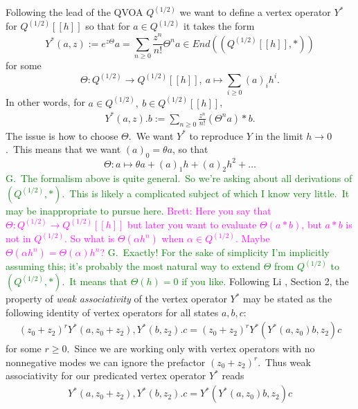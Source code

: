 \documentclass[12pt]{amsart}
\theoremstyle{plain}
\theoremstyle{definition}
\theoremstyle{remark}
\begin{document}
 Following the lead of the QVOA $Q^{(1/2)}$ we want to define a vertex operator $Y^*$ for $Q^{(1/2)}[[h]]$ so that for $a\in Q^{(1/2)}$ it takes the form
 $$Y^*(a, z) := e^{z\Theta}a = \sum_{n\geq0} \frac{z^n}{n!} \Theta^na\in End((Q^{(1/2)}[[h]], *))$$
 for some 
 $$\Theta: Q^{(1/2)}\longrightarrow Q^{(1/2)}[[h]],\ a\mapsto \sum_{i\geq0} (a)_ih^i.$$
In other words, 
for $a\in Q^{(1/2)},\ b\in Q^{(1/2)}[[h]]$, 
\begin{eqnarray}\label{deformedY}
Y^*(a, z).b := \sum_{n\geq0} \frac{z^n}{n!}(\Theta^na)*b.
\end{eqnarray}
The issue is how to choose $\Theta$.\ We want $Y^*$ to reproduce $Y$ in the limit $h\rightarrow 0$.\ 
This means that we want $(a)_0=\theta a$, so that
$$\Theta:a \mapsto \theta a+ (a)_1h+(a)_2h^2+\hdots$$
\textcolor{green}{G.\ The formalism above is quite general.\ So we're asking about all derivations of $(Q^{(1/2)}, *)$.\ This is likely a complicated subject of which I know very little.\ It may be inappropriate to pursue here. }\textcolor{magenta}{Brett: Here you say that $\Theta\colon Q^{(1/2)}\rightarrow Q^{(1/2)}[[h]]$ but later you want to evaluate $\Theta(a*b)$, but $a*b$ is not in $Q^{(1/2)}$. So what is $\Theta(\alpha h^n)$ when $\alpha\in Q^{(1/2)}$. Maybe $\Theta(\alpha h^n)=\Theta(\alpha)h^n$? }\textcolor{green}{G.\ Exactly! For the sake of simplicity I'm implicitly assuming this; it's probably the most natural way to extend $\Theta$ from $Q^{(1/2)}$ to $(Q^{(1/2)}, *)$.\ It means that $\Theta(h)=0$ if you like.}
 \medskip
 Following Li \cite{Li}, Section 2, the property of \textit{weak associativity} of the vertex operator $Y^*$ may be stated as the following identity of vertex operators for all states $a, b, c$:
 \begin{eqnarray*}
(z_0+z_2)^rY^*(a, z_0+z_2),Y^*(b, z_2).c
  =(z_0+z_2)^r Y^*(Y^*(a, z_0)b, z_2)c   \end{eqnarray*}
 for some $r\geq0$.\ Since we are working only with vertex operators with no nonnegative modes we can ignore the prefactor $(z_0+z_2)^r$.\ Thus weak associativity for our predicated vertex operator $Y^*$ reads
\begin{eqnarray}\label{weakassoc}
Y^*(a, z_0+z_2),Y^*(b, z_2).c
  =Y^*(Y^*(a, z_0)b, z_2)c   \end{eqnarray}
\end{document}
